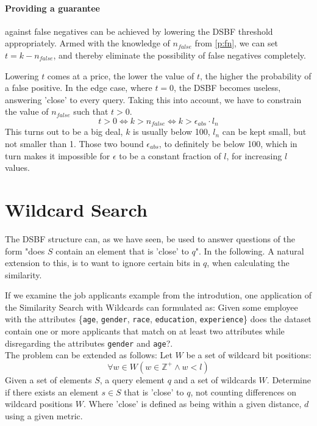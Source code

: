 \documentclass[a4paper,11pt]{article}
\begin{document}
\paragraph{Providing a guarantee} against false negatives can be achieved by lowering the DSBF threshold appropriately. Armed with the knowledge of $n_{false}$ from \ref{p:fn}, we can set $t = k - n_{false}$, and thereby eliminate the possibility of false negatives completely.

Lowering $t$ comes at a price, the lower the value of $t$, the higher the probability of a false positive. In the edge case, where $t=0$, the DSBF becomes useless, answering 'close' to every query. Taking this into account, we have to constrain the value of $n_{false}$ such that $t>0$.
\[t > 0 \Leftrightarrow k > n_{false} \Leftrightarrow k > \epsilon_{abs} \cdot l_n\]
This turns out to be a big deal, $k$ is usually below 100, $l_n$ can be kept small, but not smaller than 1. Those two bound $\epsilon_{abs}$, to definitely be below 100, which in turn makes it impossible for $\epsilon$ to be a constant fraction of $l$, for increasing $l$ values.

\section{Wildcard Search}
The DSBF structure can, as we have seen, be used to answer questions of the form "does $S$ contain an element that is 'close' to $q$". In the following. A natural extension to this, is to want to ignore certain bits in $q$, when calculating the similarity.

If we examine the job applicants example from the introdution, one application of the Similarity Search with Wildcards can formulated as: Given some employee with the attributes \{\texttt{age}, \texttt{gender}, \texttt{race}, \texttt{education}, \texttt{experience}\} does the dataset contain one or more applicants that match on at least two attributes while disregarding the attributes \texttt{gender} and \texttt{age}?.\\

The problem can be extended as follows: Let $W$ be a set of wildcard bit positions:
\[\forall w \in W (w \in \mathbb{Z}^+ \land w < l)\]
Given a set of elements $S$, a query element $q$ and a set of wildcards $W$. Determine if there exists an element $s \in S$ that is 'close' to $q$, not counting differences on wildcard positions $W$. Where 'close' is defined as being within a given distance, $d$ using a given metric.
\end{document}
